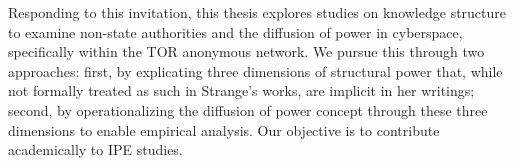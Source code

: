 Responding to this invitation, this thesis explores studies on knowledge structure to examine non-state authorities and the diffusion of power in cyberspace, specifically within the TOR anonymous network. We pursue this through two approaches: first, by explicating three dimensions of structural power that, while not formally treated as such in Strange's works, are implicit in her writings; second, by operationalizing the diffusion of power concept through these three dimensions to enable empirical analysis. Our objective is to contribute academically to IPE studies.